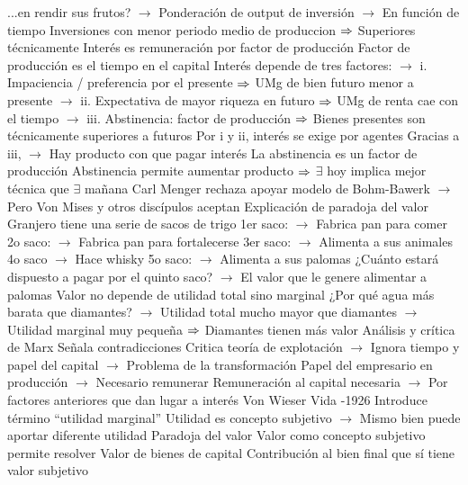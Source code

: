 \documentclass{nuevotema}
\begin{document}
\begin{esquemal}
				\4[] ...en rendir sus frutos?
				\4[] $\to$ Ponderación de output de inversión
				\4[] $\to$ En función de tiempo
				\4[] Inversiones con menor periodo medio de produccion
				\4[] $\Rightarrow$ Superiores técnicamente
				\4 Interés es remuneración por factor de producción
				\4[] Factor de producción es el tiempo en el capital
				\4[] Interés depende de tres factores:
				\4[] $\to$ i. Impaciencia / preferencia por el presente
				\4[] $\Rightarrow$ UMg de bien futuro menor a presente
				\4[] $\to$ ii. Expectativa de mayor riqueza en futuro
				\4[] $\Rightarrow$ UMg de renta cae con el tiempo
				\4[] $\to$ iii. Abstinencia: factor de producción
				\4[] $\Rightarrow$ Bienes presentes son técnicamente superiores a futuros
				\4[] Por i y ii, interés se exige por agentes
				\4[] Gracias a iii,
				\4[] $\to$ Hay producto con que pagar interés
				\4[] La abstinencia es un factor de producción
				\4[] Abstinencia permite aumentar producto
				\4[] $\Rightarrow$ $\exists$ hoy implica mejor técnica que $\exists$ mañana
				\4[] Carl Menger rechaza apoyar modelo de Bohm-Bawerk
				\4[] $\to$ Pero Von Mises y otros discípulos aceptan
				\4 Explicación de paradoja del valor
				\4[] Granjero tiene una serie de sacos de trigo
				\4[] 1er saco:
				\4[] $\to$ Fabrica pan para comer
				\4[] 2o saco:
				\4[] $\to$ Fabrica pan para fortalecerse
				\4[] 3er saco:
				\4[] $\to$ Alimenta a sus animales
				\4[] 4o saco
				\4[] $\to$ Hace whisky
				\4[] 5o saco:
				\4[] $\to$ Alimenta a sus palomas
				\4[] ¿Cuánto estará dispuesto a pagar por el quinto saco?
				\4[] $\to$ El valor que le genere alimentar a palomas
				\4[] Valor no depende de utilidad total sino marginal
				\4[] ¿Por qué agua más barata que diamantes?
				\4[] $\to$ Utilidad total mucho mayor que diamantes
				\4[] $\to$ Utilidad marginal muy pequeña
				\4[] $\Rightarrow$ Diamantes tienen más valor
				\4 Análisis y crítica de Marx
				\4[] Señala contradicciones
				\4[] Critica teoría de explotación
				\4[] $\to$ Ignora tiempo y papel del capital
				\4[] $\to$ Problema de la transformación
				\4[] Papel del empresario en producción
				\4[] $\to$ Necesario remunerar
				\4[] Remuneración al capital necesaria
				\4[] $\to$ Por factores anteriores que dan lugar a interés
			\3 Von Wieser
				\4 Vida
				-1926
				\4 Introduce término ``utilidad marginal''
				\4 Utilidad es concepto subjetivo
				\4[] $\to$ Mismo bien puede aportar diferente utilidad
				\4 Paradoja del valor
				\4[] Valor como concepto subjetivo permite resolver
				\4 Valor de bienes de capital
				\4[] Contribución al bien final que sí tiene valor subjetivo

\end{esquemal}
\end{document}
